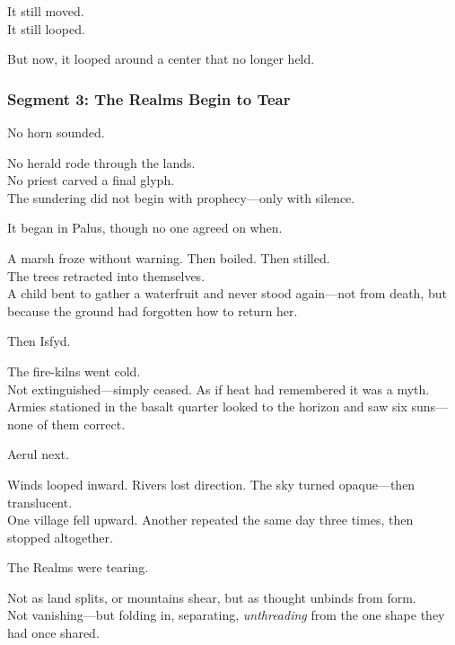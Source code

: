 \documentclass[9pt]{article}
\begin{document}
\vspace{0.5em}
It still moved.\\
It still looped.

\vspace{0.5em}
But now, it looped around a center that no longer held.

\newpage

\subsubsection*{Segment 3: The Realms Begin to Tear}

No horn sounded.

\vspace{0.5em}
No herald rode through the lands.\\
No priest carved a final glyph.\\
The sundering did not begin with prophecy---only with silence.

\vspace{0.5em}
It began in Palus, though no one agreed on when.

\vspace{0.5em}
A marsh froze without warning. Then boiled. Then stilled.\\
The trees retracted into themselves.\\
A child bent to gather a waterfruit and never stood again---not from death, but because the ground had forgotten how to return her.

\vspace{0.5em}
Then Isfyd.

\vspace{0.5em}
The fire-kilns went cold.\\
Not extinguished---simply ceased. As if heat had remembered it was a myth.\\
Armies stationed in the basalt quarter looked to the horizon and saw six suns---none of them correct.

\vspace{0.5em}
Aerul next.

\vspace{0.5em}
Winds looped inward. Rivers lost direction. The sky turned opaque---then translucent.\\
One village fell upward. Another repeated the same day three times, then stopped altogether.

\vspace{0.5em}
The Realms were tearing.

\vspace{0.5em}
Not as land splits, or mountains shear, but as thought unbinds from form.\\
Not vanishing---but folding in, separating, \textit{unthreading} from the one shape they had once shared.
\end{document}
